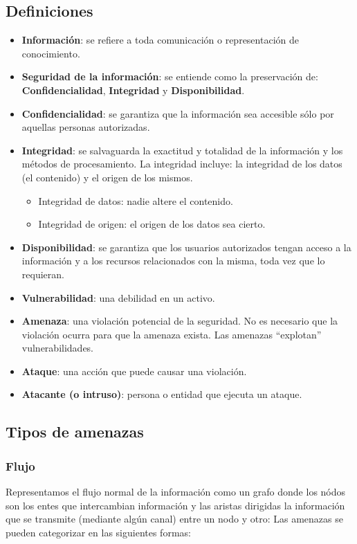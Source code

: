 \documentclass[]{article}
\begin{document}
\subsection{Definiciones}
\begin{itemize}
	\item \textbf{Información}: se refiere a toda comunicación o representación de conocimiento.
	\item \textbf{Seguridad de la información}: se entiende como la preservación de: \textbf{Confidencialidad}, \textbf{Integridad} y \textbf{Disponibilidad}.
	\item \textbf{Confidencialidad}: se garantiza que la información sea accesible sólo por aquellas personas autorizadas.
	\item \textbf{Integridad}: se salvaguarda la exactitud y totalidad de la información y los métodos de procesamiento. La integridad incluye: la integridad de los datos (el contenido) y el origen de los mismos.
	\begin{itemize}
		\item Integridad de datos: nadie altere el contenido.
		\item Integridad de origen: el origen de los datos sea cierto.
	\end{itemize}
	\item \textbf{Disponibilidad}: se garantiza que los usuarios autorizados tengan acceso a la información y a los recursos relacionados con la misma, toda vez que lo requieran.
	\item \textbf{Vulnerabilidad}: una debilidad en un activo.
	\item \textbf{Amenaza}: una violación potencial de la seguridad. No es necesario que la violación ocurra para que la amenaza exista. Las amenazas ``explotan'' vulnerabilidades.
	\item \textbf{Ataque}: una acción que puede causar una violación.
	\item \textbf{Atacante (o intruso)}: persona o entidad que ejecuta un ataque.
\end{itemize}

\subsection{Tipos de amenazas}
\subsubsection{Flujo}
Representamos el flujo normal de la información como un grafo donde los nódos son los entes que intercambian información y las aristas dirigidas la información que se transmite (mediante algún canal) entre un nodo y otro:
Las amenazas se pueden categorizar en las siguientes formas:
\end{document}
